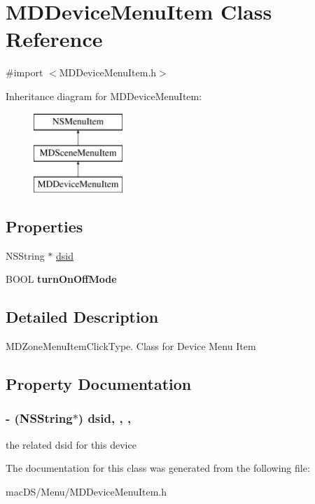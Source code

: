 \hypertarget{interface_m_d_device_menu_item}{\section{M\-D\-Device\-Menu\-Item Class Reference}
\label{interface_m_d_device_menu_item}
}


{\ttfamily \#import $<$M\-D\-Device\-Menu\-Item.\-h$>$}

Inheritance diagram for M\-D\-Device\-Menu\-Item\-:\begin{figure}[H]
\begin{center}
\leavevmode
\includegraphics[height=3.000000cm]{interface_m_d_device_menu_item}
\end{center}
\end{figure}
\subsection*{Properties}
\begin{DoxyCompactItemize}
\item 
N\-S\-String $\ast$ \hyperlink{interface_m_d_device_menu_item_aba1a1c831e4cace1935fef25e04a4b27}{dsid}
\item 
\hypertarget{interface_m_d_device_menu_item_a6c6cf5c639107bdcf7abf5d31fe4d553}{B\-O\-O\-L {\bfseries turn\-On\-Off\-Mode}}\label{interface_m_d_device_menu_item_a6c6cf5c639107bdcf7abf5d31fe4d553}

\end{DoxyCompactItemize}


\subsection{Detailed Description}
M\-D\-Zone\-Menu\-Item\-Click\-Type. Class for Device Menu Item 

\subsection{Property Documentation}
\hypertarget{interface_m_d_device_menu_item_aba1a1c831e4cace1935fef25e04a4b27}{
\subsubsection[{dsid}]{\setlength{\rightskip}{0pt plus 5cm}-\/ (N\-S\-String$\ast$) dsid\hspace{0.3cm}{\ttfamily [read]}, {\ttfamily [write]}, {\ttfamily [atomic]}, {\ttfamily [strong]}}}\label{interface_m_d_device_menu_item_aba1a1c831e4cace1935fef25e04a4b27}
the related dsid for this device 

The documentation for this class was generated from the following file\-:\begin{DoxyCompactItemize}
\item 
mac\-D\-S/\-Menu/M\-D\-Device\-Menu\-Item.\-h\end{DoxyCompactItemize}
